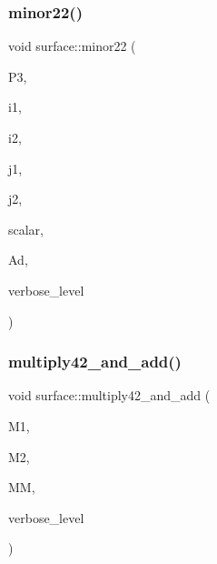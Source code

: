 \subsubsection{\texorpdfstring{minor22()}{minor22()}}
{\footnotesize\ttfamily void surface\+::minor22 (\begin{DoxyParamCaption}\item[{\mbox{\hyperlink{galois_8h_a09fddde158a3a20bd2dcadb609de11dc}{I\+NT}} $\ast$$\ast$}]{P3,  }\item[{\mbox{\hyperlink{galois_8h_a09fddde158a3a20bd2dcadb609de11dc}{I\+NT}}}]{i1,  }\item[{\mbox{\hyperlink{galois_8h_a09fddde158a3a20bd2dcadb609de11dc}{I\+NT}}}]{i2,  }\item[{\mbox{\hyperlink{galois_8h_a09fddde158a3a20bd2dcadb609de11dc}{I\+NT}}}]{j1,  }\item[{\mbox{\hyperlink{galois_8h_a09fddde158a3a20bd2dcadb609de11dc}{I\+NT}}}]{j2,  }\item[{\mbox{\hyperlink{galois_8h_a09fddde158a3a20bd2dcadb609de11dc}{I\+NT}}}]{scalar,  }\item[{\mbox{\hyperlink{galois_8h_a09fddde158a3a20bd2dcadb609de11dc}{I\+NT}} $\ast$}]{Ad,  }\item[{\mbox{\hyperlink{galois_8h_a09fddde158a3a20bd2dcadb609de11dc}{I\+NT}}}]{verbose\+\_\+level }\end{DoxyParamCaption})}

\mbox{\label{classsurface_a3556917614250f9150bdf69f525a18d2}} 
\subsubsection{\texorpdfstring{multiply42\+\_\+and\+\_\+add()}{multiply42\_and\_add()}}
{\footnotesize\ttfamily void surface\+::multiply42\+\_\+and\+\_\+add (\begin{DoxyParamCaption}\item[{\mbox{\hyperlink{galois_8h_a09fddde158a3a20bd2dcadb609de11dc}{I\+NT}} $\ast$}]{M1,  }\item[{\mbox{\hyperlink{galois_8h_a09fddde158a3a20bd2dcadb609de11dc}{I\+NT}} $\ast$}]{M2,  }\item[{\mbox{\hyperlink{galois_8h_a09fddde158a3a20bd2dcadb609de11dc}{I\+NT}} $\ast$}]{MM,  }\item[{\mbox{\hyperlink{galois_8h_a09fddde158a3a20bd2dcadb609de11dc}{I\+NT}}}]{verbose\+\_\+level }\end{DoxyParamCaption})}

